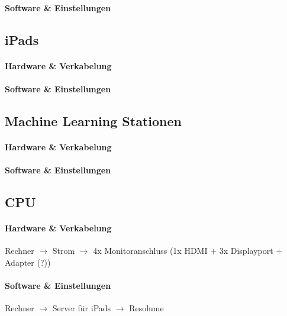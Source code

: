 \documentclass [titlepage,a4paper]{article}
\begin{document}
\paragraph{Software \& Einstellungen}


\subsection{iPads}

\paragraph{Hardware \& Verkabelung}

\paragraph{Software \& Einstellungen}


\subsection{Machine Learning Stationen}

\paragraph{Hardware \& Verkabelung}

\paragraph{Software \& Einstellungen}



\subsection{CPU}

\paragraph{Hardware \& Verkabelung}

Rechner $\rightarrow$ Strom
        $\rightarrow$ 4x Monitoranschluss (1x HDMI + 3x Displayport + Adapter (?))

\paragraph{Software \& Einstellungen}

Rechner $\rightarrow$ Server für iPads
        $\rightarrow$ Resolume
\end{document}
